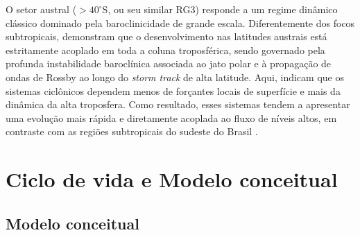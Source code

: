 O setor austral ($>40^\circ$S, ou seu similar RG3) responde a um regime dinâmico clássico dominado pela baroclinicidade de grande escala. Diferentemente dos focos subtropicais, \citet{hoskins2005new} demonstram que o desenvolvimento nas latitudes austrais está estritamente acoplado em toda a coluna troposférica, sendo governado pela profunda instabilidade baroclínica associada ao jato polar e à propagação de ondas de Rossby ao longo do \textit{storm track} de alta latitude. Aqui, \citet{simmonds2000variability} indicam que os sistemas ciclônicos dependem menos de forçantes locais de superfície e mais da dinâmica da alta troposfera. Como resultado, esses sistemas tendem a apresentar uma evolução mais rápida e diretamente acoplada ao fluxo de níveis altos, em contraste com as regiões subtropicais do sudeste do Brasil \citep{vera2002cold}. 
%

\section{Ciclo de vida e Modelo conceitual}\label{sec:tb_evolucion}

\subsection{Modelo conceitual}\label{subsec:tb_modelos}

